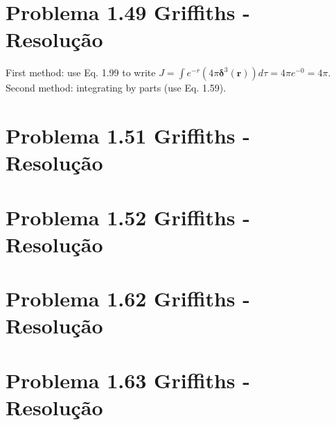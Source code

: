 \documentclass[a4paper,12pt]{article}
\newcommand{\printingbibliography}{%

    \pagestyle{myheadings}
    \markright{}
    \sloppy
    \printbibliography[heading=bibintoc, %
                   title=Refer\^encias %
                  ]
    \fussy%
}
\begin{document}
\section*{Problema 1.49 Griffiths - Resolu\c{c}\~ao}
First method: use Eq. 1.99 to write $J=\int e^{-r}\left(4 \pi \boldsymbol{\delta}^{3}(\mathbf{r})\right) d \tau=4 \pi e^{-0}=4 \pi$.\\
Second method: integrating by parts (use Eq. 1.59).

\section*{Problema 1.51 Griffiths - Resolu\c{c}\~ao}

\section*{Problema 1.52 Griffiths - Resolu\c{c}\~ao}

\section*{Problema 1.62 Griffiths - Resolu\c{c}\~ao}

\section*{Problema 1.63 Griffiths - Resolu\c{c}\~ao}

\end{document}
